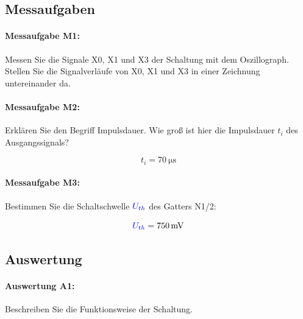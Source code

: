 \documentclass[11pt,a4paper,titlepage]{scrreprt}
\begin{document}
      \subsection{Messaufgaben}
        \paragraph{Messaufgabe M1:} Messen Sie die Signale X0, X1 und X3 der Schaltung mit dem Oszillograph. Stellen Sie die Signalverläufe von X0, X1 und X3 in einer Zeichnung untereinander da.


        \paragraph{Messaufgabe M2:} Erklären Sie den Begriff Impulsdauer. Wie groß ist hier die Impulsdauer $t_i$ des Ausgangssignals?

          \begin{equation*}
            t_i = \SI{70}{\micro\second}
          \end{equation*}

        \paragraph{Messaufgabe M3:} Bestimmen Sie die Schaltschwelle $\textcolor{blue}{U_{th}}$ des Gatters N1/2:

          \begin{equation*}
            \textcolor{blue}{U_{th}} = \SI{750}{\milli\volt}
          \end{equation*}

      \subsection{Auswertung}
        \paragraph{Auswertung A1:} Beschreiben Sie die Funktionsweise der Schaltung.
        
\end{document}
